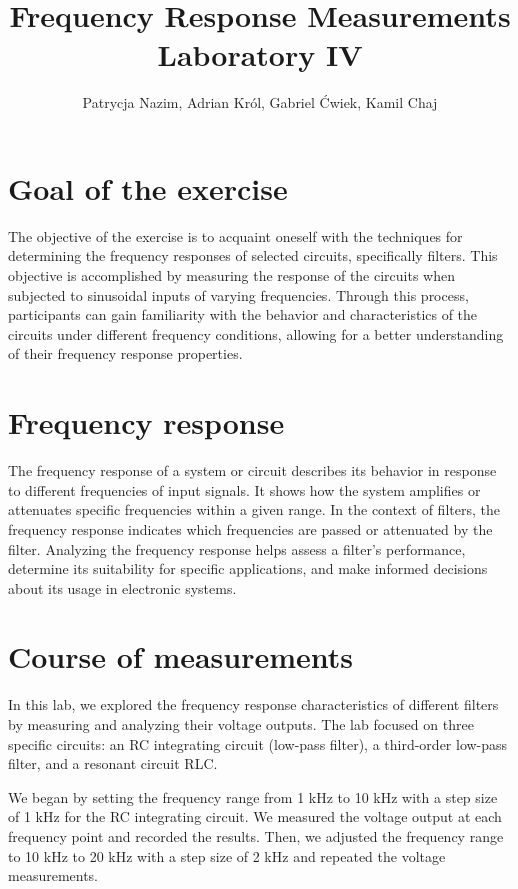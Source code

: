 \documentclass[notitlepage, a4paper, 11pt]{article}
\title{Frequency Response Measurements\\
	\large Laboratory IV}
\author{Patrycja Nazim, Adrian Król, Gabriel Ćwiek, Kamil Chaj}
\date{}
\begin{document}
	\maketitle
	\section{Goal of the exercise}
	
	The objective of the exercise is to acquaint oneself with the techniques for determining the frequency responses of selected circuits, specifically filters. This objective is accomplished by measuring the response of the circuits when subjected to sinusoidal inputs of varying frequencies. Through this process, participants can gain familiarity with the behavior and characteristics of the circuits under different frequency conditions, allowing for a better understanding of their frequency response properties.
	
	\section{Frequency response}
	
	The frequency response of a system or circuit describes its behavior in response to different frequencies of input signals. It shows how the system amplifies or attenuates specific frequencies within a given range. In the context of filters, the frequency response indicates which frequencies are passed or attenuated by the filter. Analyzing the frequency response helps assess a filter's performance, determine its suitability for specific applications, and make informed decisions about its usage in electronic systems.
	
	
	
	\section{Course of measurements}
	
	In this lab, we explored the frequency response characteristics of different filters by measuring and analyzing their voltage outputs. The lab focused on three specific circuits: an RC integrating circuit (low-pass filter), a third-order low-pass filter, and a resonant circuit RLC.
		
	We began by setting the frequency range from 1 kHz to 10 kHz with a step size of 1 kHz for the RC integrating circuit. We measured the voltage output at each frequency point and recorded the results. Then, we adjusted the frequency range to 10 kHz to 20 kHz with a step size of 2 kHz and repeated the voltage measurements.
	
\end{document}
